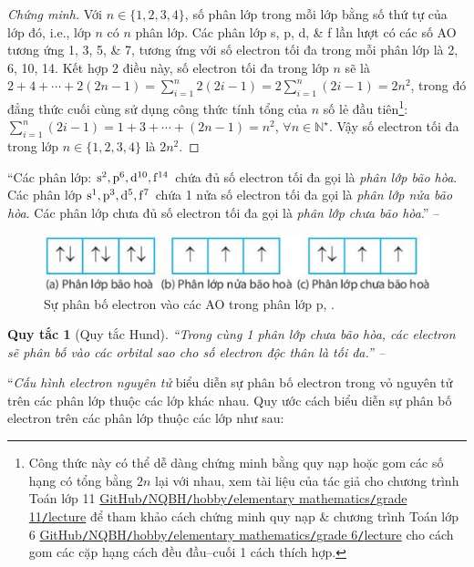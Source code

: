 \documentclass{article}
\numberwithin{equation}{section}
\newtheorem{quytac}{Quy tắc}[section]
\begin{document}
\begin{proof}[Chứng minh]
	Với $n\in\{1,2,3,4\}$, số phân lớp trong mỗi lớp bằng số thứ tự của lớp đó, i.e., lớp $n$ có $n$ phân lớp. Các phân lớp s, p, d, \& f lần lượt có các số AO tương ứng 1, 3, 5, \& 7, tương ứng với số electron tối đa trong mỗi phân lớp là 2, 6, 10, 14. Kết hợp 2 điều này, số electron tối đa trong lớp $n$ sẽ là $2 + 4 + \cdots + 2(2n - 1) = \sum_{i=1}^n 2(2i - 1) = 2\sum_{i=1}^n (2i - 1) = 2n^2$, trong đó đẳng thức cuối cùng sử dụng công thức tính tổng của $n$ số lẻ đầu tiên\footnote{Công thức này có thể dễ dàng chứng minh bằng quy nạp hoặc gom các số hạng có tổng bằng $2n$ lại với nhau, xem tài liệu của tác giả cho chương trình Toán lớp 11 \href{https://github.com/NQBH/hobby/blob/master/elementary_mathematics/grade_11/NQBH_elementary_mathematics_grade_11.pdf}{GitHub\texttt{/}NQBH\texttt{/}hobby\texttt{/}elementary mathematics\texttt{/}grade 11\texttt{/}lecture} để tham khảo cách chứng minh quy nạp \& chương trình Toán lớp 6 \href{https://github.com/NQBH/hobby/blob/master/elementary_mathematics/grade_6/NQBH_elementary_mathematics_grade_6.pdf}{GitHub\texttt{/}NQBH\texttt{/}hobby\texttt{/}elementary mathematics\texttt{/}grade 6\texttt{/}lecture} cho cách gom các cặp hạng cách đều đầu--cuối 1 cách thích hợp.}: $\sum_{i=1}^n (2i - 1) = 1 + 3 + \cdots + (2n - 1) = n^2$, $\forall n\in\mathbb{N}^\star$. Vậy số electron tối đa trong lớp $n\in\{1,2,3,4\}$ là $2n^2$.
\end{proof}
``Các phân lớp: $\rm s^2,p^6,d^{10},f^{14}$ chứa đủ số electron tối đa gọi là \textit{phân lớp bão hòa}. Các phân lớp $\rm s^1,p^3,d^5,f^7$ chứa 1 nửa số electron tối đa gọi là \textit{phân lớp nửa bão hòa}. Các phân lớp chưa đủ số electron tối đa gọi là \textit{phân lớp chưa bão hòa}.'' -- \cite[p. 31]{SGK_Hoa_Hoc_10_Chan_Troi_Sang_Tao}

\begin{figure}[h]
	\centering
	\includegraphics[scale=0.15]{su_phan_bo_electron_vao_cac_AO_trong_phan_lop_p}
	\caption{Sự phân bố electron vào các AO trong phân lớp p, \cite[Hình 4.10, p. 31]{SGK_Hoa_Hoc_10_Chan_Troi_Sang_Tao}.}
\end{figure}

\begin{quytac}[Quy tắc Hund]
	``Trong cùng 1 phân lớp chưa bão hòa, các electron sẽ phân bố vào các orbital sao cho số electron độc thân là tối đa.'' -- \cite[p. 31]{SGK_Hoa_Hoc_10_Chan_Troi_Sang_Tao}
\end{quytac}
``\textit{Cấu hình electron nguyên tử} biểu diễn sự phân bố electron trong vỏ nguyên tử trên các phân lớp thuộc các lớp khác nhau. Quy ước cách biểu diễn sự phân bố electron trên các phân lớp  thuộc các lớp như sau:
\end{document}
